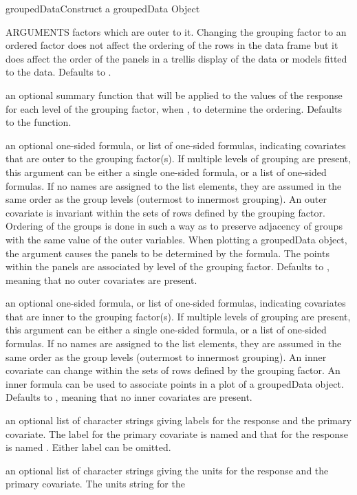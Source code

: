 \documentclass[pdftex]{article} \usepackage{url,graphicx}
\begin{document}
\begin{Helpfile}{groupedData}{Construct a groupedData Object}
\begin{Argument}{ARGUMENTS}
factors which are outer to it. Changing the grouping factor to an
ordered factor does not affect the ordering of the rows in the data
frame but it does affect the order of the panels in a trellis display
of the data or models fitted to the data.  Defaults to .
\item[\Co{FUN:}]
an optional summary function that will be applied to the
values of the response for each level of the grouping factor, when
, to determine the ordering.  Defaults to
the  function.
\item[\Co{outer:}]
an optional one-sided formula, or list of one-sided
formulas, indicating covariates that are outer to the grouping
factor(s).  If multiple levels of grouping are present,
this argument can be either a single one-sided formula, or a list of
one-sided formulas. If no names are assigned to the list elements,
they are assumed in the same order as the group levels (outermost to
innermost grouping). An outer covariate is invariant within the sets
of rows defined by the grouping factor.  Ordering of the groups is
done in such a way as to preserve adjacency of groups with the same
value of the outer variables.  When plotting a  groupedData object,
the argument  causes the panels to be determined
by the  formula.  The points within the panels are 
associated by level of the grouping factor. Defaults to ,
meaning that no outer covariates are present.
\item[\Co{inner:}]
an optional one-sided formula, or list of one-sided
formulas, indicating covariates that are inner to the grouping
factor(s). If multiple levels of grouping are present,
this argument can be either a single one-sided formula, or a list of
one-sided formulas. If no names are assigned to the list elements,
they are assumed in the same order as the group levels (outermost to
innermost grouping). An inner covariate can change 
within the sets of rows defined by the grouping factor.  An inner
formula can be used to associate points in a plot of a groupedData
object.  Defaults to , meaning that no inner covariates
are present.
\item[\Co{labels:}]
an optional list of character strings giving labels for
the response and the primary covariate.  The label for the primary
covariate is named  and that for the response is named
.  Either label can be omitted.
\item[\Co{units:}]
an optional list of character strings giving the units for
the response and the primary covariate.  The units string for the

\end{Argument}
\end{Helpfile}
\end{document}
